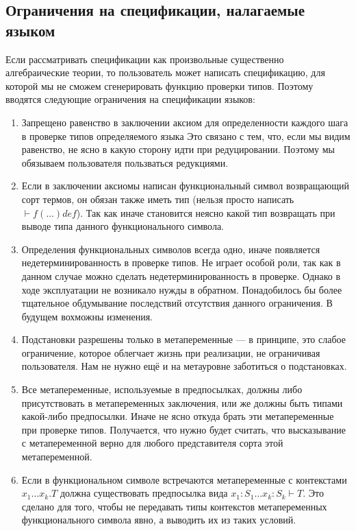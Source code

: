 \subsection{Ограничения на спецификации, налагаемые языком}\label{constraints}
Если рассматривать спецификации как произвольные существенно алгебраические теории, то пользователь может написать спецификацию, для которой мы не сможем сгенерировать функцию проверки типов. Поэтому вводятся следующие ограничения на спецификации языков:

\begin{enumerate}
\item Запрещено равенство в заключении аксиом для определенности каждого шага в проверке типов определяемого языка Это связано с тем, что, если мы видим равенство, не ясно в какую сторону идти при редуцировании. Поэтому мы обязываем пользователя пользваться редукциями.

\item Если в заключении аксиомы написан функциональный символ возвращающий сорт термов, он обязан также иметь тип (нельзя просто написать $ \vdash f(\ldots) def$). Так как иначе становится неясно какой тип возвращать при выводе типа данного функционального символа.

\item Определения функциональных символов всегда одно, иначе появляется недетерминированность в проверке типов. Не играет особой роли, так как в данном случае можно сделать недетерминированность в проверке. Однако в ходе эксплуатации не возникало нужды в обратном. Понадобилось бы более тщательное обдумывание последствий отсутствия данного ограничения. В будущем вохможны изменения.

\item Подстановки разрешены только в метапеременные --- в принципе, это слабое ограничение, которое облегчает жизнь при реализации, не ограничивая пользователя. Нам не нужно ещё и на метауровне заботиться о подстановках.

\item \label{tm:Meta} Все метапеременные, используемые в предпосылках, должны либо присутствовать в метапеременных заключения, или же должны быть типами какой-либо предпосылки. Иначе не ясно откуда брать эти метапеременные при проверке типов. Получается, что нужно будет считать, что высказывание с метапеременной верно для любого представителя сорта этой метапеременной.

\item Если в функциональном символе встречаются метапеременные с контекстами $x_1 \ldots x_k . T$ должна существовать предпосылка вида $x_1 : S_1 \ldots x_k : S_k  \vdash T$. Это сделано для того, чтобы не передавать типы контекстов метапеременных функционального символа явно, а выводить их из таких условий.


\end{enumerate}
